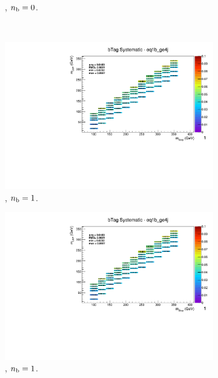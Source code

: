 \begin{figure}[ht!]
\begin{subfigure}[b]{0.32\textwidth}
    \caption{\njhigh, $n_{\text{b}} = 0$.}
  \end{subfigure}\\
  \begin{subfigure}[b]{0.32\textwidth}
    \includegraphics[width=\textwidth, page=12]{Figs/sms/t2cc/v37_2/systs/T2cc_bTag_eq1b_ge4j.pdf}
    \caption{\njhigh, $n_{\text{b}} = 1$.}
  \end{subfigure}
  \begin{subfigure}[b]{0.32\textwidth}
    \includegraphics[width=\textwidth, page=8]{Figs/sms/t2cc/v37_2/systs/T2cc_bTag_eq1b_ge4j.pdf}
    \caption{\njhigh, $n_{\text{b}} = 1$.}
  \end{subfigure}
  \begin{subfigure}[b]{0.32\textwidth}

\end{subfigure}
\end{figure}

